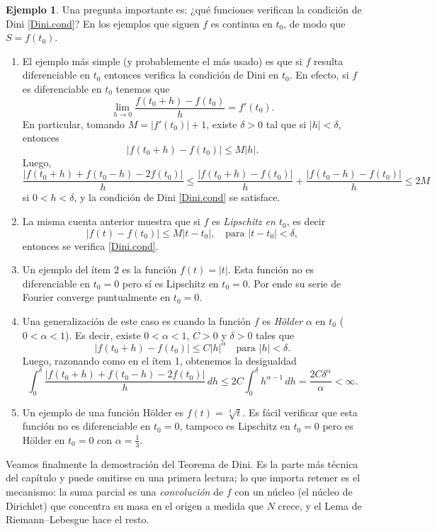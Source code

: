 \documentclass[12pt, a4paper]{amsbook}
\theoremstyle{remark}
\theoremstyle{definition}
\newtheorem{ejem}[teo]{Ejemplo}
\numberwithin{section}{chapter}
\numberwithin{subsection}{section}
\numberwithin{equation}{section}
\numberwithin{figure}{chapter}
\begin{document}
\begin{ejem}
Una pregunta importante es: ¿qué funciones verifican la condición de Dini \eqref{Dini.cond}? En los ejemplos que siguen $f$ es continua en $t_0$, de modo que $S=f(t_0)$.
\begin{enumerate}
\item El ejemplo más simple (y probablemente el más usado) es que si $f$ resulta diferenciable en $t_0$ entonces verifica la condición de Dini en $t_0$. En efecto, si $f$ es diferenciable en $t_0$ tenemos que
$$
\lim_{h\to 0} \frac{f(t_0+h)-f(t_0)}{h} = f'(t_0).
$$
En particular, tomando $M=|f'(t_0)|+1$, existe $\delta>0$ tal que si $|h|<\delta$, entonces
$$
|f(t_0+h)-f(t_0)|\le M|h|.
$$
Luego,
$$
\frac{|f(t_0+h)+f(t_0-h)-2f(t_0)|}{h}\le \frac{|f(t_0+h)-f(t_0)|}{h} + \frac{|f(t_0-h)-f(t_0)|}{h}\le 2M
$$
si $0<h<\delta$, y la condición de Dini \eqref{Dini.cond} se satisface.

\item La misma cuenta anterior muestra que si $f$ es {\em Lipschitz en $t_0$}, es decir
$$
|f(t)-f(t_0)|\le M |t-t_0|, \quad \text{para } |t-t_0|<\delta,
$$
entonces se verifica \eqref{Dini.cond}.

\item Un ejemplo del ítem 2 es la función $f(t) = |t|$. Esta función no es diferenciable en $t_0=0$ pero sí es Lipschitz en $t_0=0$. Por ende su serie de Fourier converge puntualmente en $t_0=0$.

\item Una generalización de este caso es cuando la función $f$ es {\em Hölder} $\alpha$ en $t_0$ ($0<\alpha<1$). Es decir, existe $0<\alpha<1$, $C>0$ y $\delta>0$ tales que
$$
|f(t_0+h)-f(t_0)|\le C|h|^\alpha \quad \text{para } |h|<\delta.
$$
Luego, razonando como en el ítem 1, obtenemos la desigualdad
$$
\int_0^\delta \frac{|f(t_0+h)+f(t_0-h)-2f(t_0)|}{h}\,dh \le 2C\int_0^\delta h^{\alpha-1}\, dh = \frac{2C\delta^\alpha}{\alpha}<\infty.
$$

\item Un ejemplo de una función Hölder es $f(t) = \sqrt[3]{t}$. Es fácil verificar que esta función no es diferenciable en $t_0=0$, tampoco es Lipschitz en $t_0=0$ pero es Hölder en $t_0=0$ con $\alpha=\frac13$.
\end{enumerate}
\end{ejem}


Veamos finalmente la demostración del Teorema de Dini. Es la parte más técnica del capítulo y puede omitirse en una primera lectura; lo que importa retener es el mecanismo: la suma parcial es una \emph{convolución} de $f$ con un núcleo (el núcleo de Dirichlet) que concentra su masa en el origen a medida que $N$ crece, y el Lema de Riemann--Lebesgue hace el resto.
\end{document}
